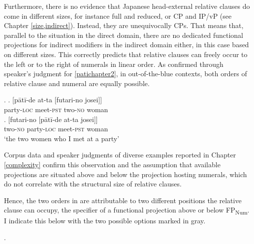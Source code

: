 \documentclass [output=book,colorlinks,citecolor=brown]{langscibook}
\begin{document}
Furthermore, there is no evidence that Japanese head-external relative clauses do come in different sizes, for instance full and reduced, or CP and IP/vP (see Chapter \ref{size,indirect}). Instead, they are unequivocally CPs. That means that, parallel to the situation in the direct domain, there are no dedicated functional projections for indirect modifiers in the indirect domain either, in this case based on different sizes. This correctly predicts that relative clauses can freely occur to the left or to the right of numerals in linear order. As confirmed through speaker’s judgment for \ref{patichapter2}, in out-of-the-blue contexts, both orders of relative clause and numeral are equally possible.

\ex. \label{patichapter2} \ag. [pātī-de at-ta [futari-no josei]]\\
party-\textsc{loc} meet-\textsc{pst} two-\textsc{no} woman \label{pati1}\\
\bg. [futari-no [pātī-de at-ta josei]]\\
two-\textsc{no} party-\textsc{loc} meet-\textsc{pst} woman\\
`the two women who I met at a party' \label{pati2}

Corpus data and speaker judgments of diverse examples reported in Chapter \ref{complexity} confirm this observation and the assumption that available projections are situated above and below the projection hosting numerals, which do not correlate with the structural size of relative clauses.

Hence, the two orders in  are attributable to two different positions the relative clause can occupy, the specifier of a functional projection above or below FP\textsubscript{Num}. I indicate this below with the two possible options marked in gray. %

\newpage

\ex. 
\end{document}

